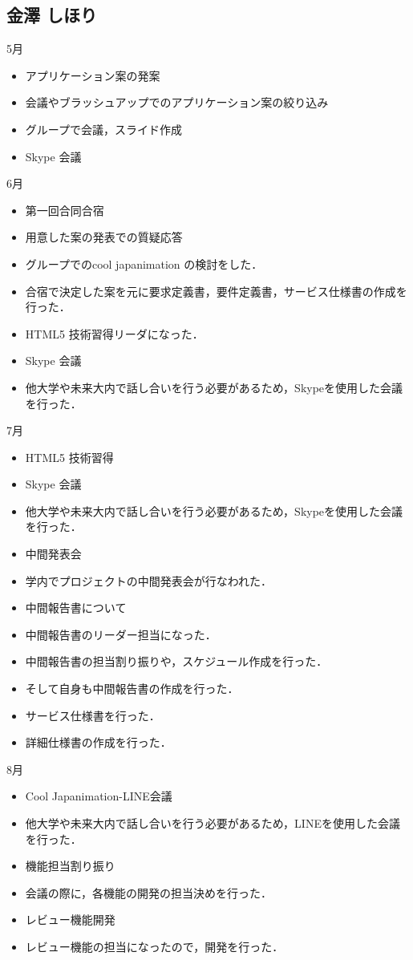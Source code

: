 \subsection{金澤 しほり}
5月
\begin{itemize}
\item アプリケーション案の発案
\item 会議やブラッシュアップでのアプリケーション案の絞り込み
\item グループで会議，スライド作成
\item Skype 会議
\end{itemize}
6月
\begin{itemize}
\item 第一回合同合宿
\item 用意した案の発表での質疑応答
\item グループでのcool japanimation の検討をした．
\item 合宿で決定した案を元に要求定義書，要件定義書，サービス仕様書の作成を行った．
\item HTML5 技術習得リーダになった．
\item Skype 会議
\item   他大学や未来大内で話し合いを行う必要があるため，Skypeを使用した会議を行った．
\end{itemize}
7月
\begin{itemize}
\item HTML5 技術習得
\item Skype 会議
\item 他大学や未来大内で話し合いを行う必要があるため，Skypeを使用した会議を行った．
\item 中間発表会
\item 学内でプロジェクトの中間発表会が行なわれた．
\item 中間報告書について
\item   中間報告書のリーダー担当になった．
\item   中間報告書の担当割り振りや，スケジュール作成を行った．
\item   そして自身も中間報告書の作成を行った．
\item サービス仕様書を行った．
\item 詳細仕様書の作成を行った．
\end{itemize}
8月
\begin{itemize}
\item Cool Japanimation-LINE会議
\item   他大学や未来大内で話し合いを行う必要があるため，LINEを使用した会議を行った．
\item 機能担当割り振り
\item 会議の際に，各機能の開発の担当決めを行った．
\item レビュー機能開発
\item   レビュー機能の担当になったので，開発を行った．
\end{itemize}

